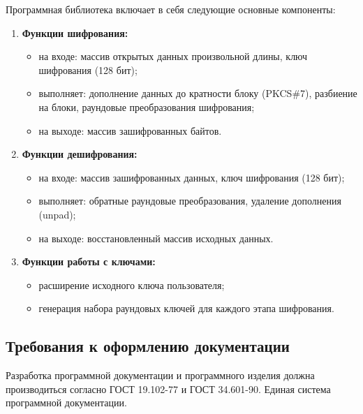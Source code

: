 Программная библиотека включает в себя следующие основные компоненты:

\begin{enumerate}
	\item \textbf{Функции шифрования:}
	\begin{itemize}
		\item на входе: массив открытых данных произвольной длины, ключ шифрования (128 бит);
		\item выполняет: дополнение данных до кратности блоку (PKCS\#7), разбиение на блоки, раундовые преобразования шифрования;
		\item на выходе: массив зашифрованных байтов.
	\end{itemize}
	
	\item \textbf{Функции дешифрования:}
	\begin{itemize}
		\item на входе: массив зашифрованных данных, ключ шифрования (128 бит);
		\item выполняет: обратные раундовые преобразования, удаление дополнения (unpad);
		\item на выходе: восстановленный массив исходных данных.
	\end{itemize}
	
	\item \textbf{Функции работы с ключами:}
	\begin{itemize}
		\item расширение исходного ключа пользователя;
		\item генерация набора раундовых ключей для каждого этапа шифрования.
	\end{itemize}
\end{enumerate}

\subsection{Требования к оформлению документации}

Разработка программной документации и программного изделия должна производиться согласно ГОСТ 19.102-77 и ГОСТ 34.601-90. Единая система программной документации.